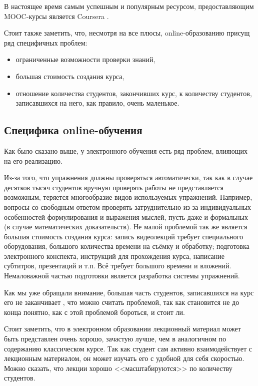 \documentclass{matmex-diploma-custom}
\begin{document}
В настоящее время самым успешным и популярным ресурсом,
предоставляющим MOOC-курсы является Coursera \cite{coursera}. %

Стоит также заметить, что, несмотря на все плюсы, online-образованию
присущ ряд специфичных проблем:
\begin{itemize}
\item ограниченные возможности проверки знаний,
\item большая стоимость создания курса,
\item отношение количества студентов, закончивших курс, к количеству
  студентов, записавшихся на него, как правило, очень маленькое.
\end{itemize}

\subsection*{Специфика online-обучения}
Как было сказано выше, у электронного обучения есть ряд проблем,
влияющих на его реализацию.

Из-за того, что упражнения должны проверяться автоматически, так как в
случае десятков тысяч студентов вручную проверять работы не
представляется возможным, теряется многообразие видов используемых
упражнений. Например, вопросы со свободным ответом проверять
затруднительно из-за индивидуальных особенностей формулирования и
выражения мыслей, пусть даже и формальных (в случае математических
доказательств).  Не малой проблемой так же является большая стоимость
создания курса: запись видеолекций требует специального оборудования,
большого количества времени на съёмку и обработку; подготовка
электронного конспекта, инструкций для прохождения курса, написание
субтитров, презентаций и т.п. Всё требует большого времени и
вложений. Немаловажной частью подготовки является разработка системы
упражнений.

Как мы уже обращали внимание, большая часть студентов, записавшихся на
курс его не заканчивает \cite{Clow}, что можно считать проблемой, так
как становится не до конца понятно, как с этой проблемой бороться, и
стоит ли.

Стоит заметить, что в электронном образовании лекционный материал
может быть представлен очень хорошо, зачастую лучше, чем в аналогичном
по содержанию классическом курсе. Так как студент сам активно
взаимодействует с лекционным материалом, он может изучать его с
удобной для себя скоростью. Можно сказать, что лекции хорошо
<<масштабируются>> по количеству студентов.
\end{document}

